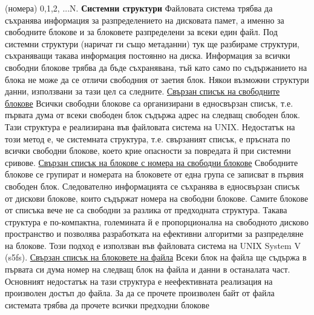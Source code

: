 \documentclass{article}
\begin{document}
(номера) 0,1,2, ...N. \newline\newline
\textbf{Системни структури} \newline\newline
Файловата система трябва да съхранява информация за разпределението на дисковата памет, а именно за свободните блокове и за блоковете разпределени
за всеки един файл. Под системни структури (наричат ги също метаданни) тук ще разбираме структури, съхраняващи такава информация постоянно на диска.
Информация за всички свободни блокове трябва да бъде съхранявана, тъй като само по съдържанието на блока не може да се отличи свободния от заетия блок.
Някои възможни структури данни, използвани за тази цел са следните. \newline\newline
\underline{Свързан списък на свободните блокове} \newline\newline
Всички свободни блокове са организирани в едносвързан списък, т.е. първата дума от всеки свободен блок съдържа адрес на следващ свободен блок. Тази
структура е реализирана във файловата система на UNIX. Недостатък на този метод е, че системната структура, т.е. свързаният списък, е пръсната по всички
свободни блокове, което крие опасности за повредата й при системни сривове. \newline\newline
\underline{Свързан списък на блокове с номера на свободни блокове} \newline\newline
Свободните блокове се групират и номерата на блоковете от една група се записват в първия свободен блок. Следователно информацията се съхранява в
едносвързан списък от дискови блокове, които съдържат номера на свободни блокове. Самите блокове от списъка вече не са свободни за разлика от предходната
структура. Такава структура е по-компактна, големината й е пропорционална на свободното дисково пространство и позволява разработката на ефективни алгоритми
за разпределяне на блокове. Този подход е използван във файловата система на UNIX System V (s5fs). \newline\newline
\underline{Свързан списък на блоковете на файла} \newline\newline
Всеки блок на файла ще съдържа в първата си дума номер на следващ блок на файла и данни в останалата част. Основният недостатък на тази структура е
неефективната реализация на произволен достъп до файла. За да се прочете произволен байт от файла системата трябва да прочете всички предходни блокове
\end{document}
